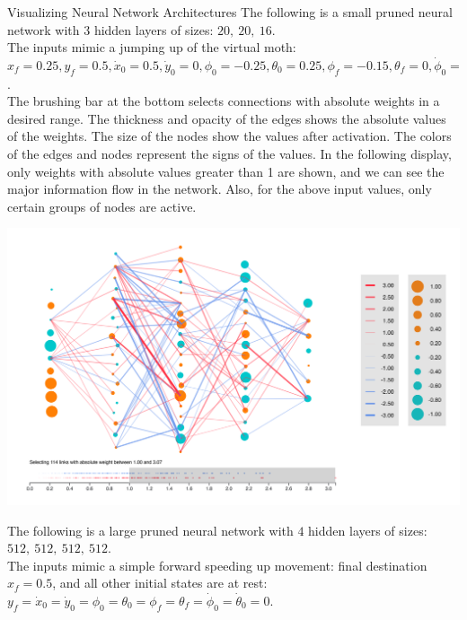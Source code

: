 \documentclass[final,hyperref={pdfpagelabels=false}]{beamer}
\begin{document}
\begin{frame}{}
\begin{columns}[t]
      \begin{column}{.4\linewidth}
      \begin{block}{Visualizing Neural Network Architectures}
      \noindent The following is a small pruned neural network with $3$ hidden layers of sizes: $20,\ 20,\ 16$.\\
      \noindent The inputs mimic a jumping up of the virtual moth: $x_f = 0.25, y_f = 0.5, \dot{x}_0 = 0.5, \dot{y}_0 = 0, \phi_0=-0.25, \theta_0=0.25, \phi_f=-0.15, \theta_f=0, \dot{\phi}_0 = -0.5, \dot{\theta}_0 = 0.5$. \\
      \bigskip
      The brushing bar at the bottom selects connections with absolute weights in a desired range. The thickness and opacity of the edges shows the absolute values of the weights. The size of the nodes show the values after activation. The colors of the edges and nodes represent the signs of the values. In the following display, only weights with absolute values greater than 1 are shown, and we can see the major information flow in the network. Also, for the above input values, only certain groups of nodes are active.
      \vspace{0cm}
      \begin{center}
                \includegraphics[scale=0.7]{NN.png}
      \end{center}
      \vspace{1cm}
        \noindent The following is a large pruned neural network with $4$ hidden layers of sizes: $512,\ 512,\ 512,\ 512$.\\
      The inputs mimic a simple forward speeding up movement: final destination $x_f = 0.5$, and all other initial states are at rest: $y_f = \dot{x}_0 =  \dot{y}_0 = \phi_0= \theta_0= \phi_f= \theta_f= \dot{\phi}_0 =  \dot{\theta}_0 = 0$. \\

\end{block}
\end{column}
\end{columns}
\end{frame}
\end{document}
